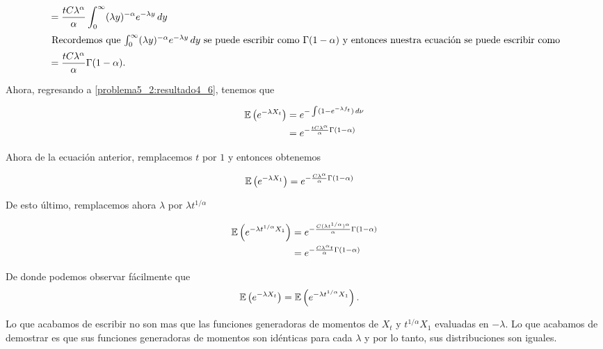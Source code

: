 \begin{align}
                                        &=  \frac{tC \lambda^{\alpha}}{\alpha} \int_0^\infty  (\lambda y)^{-\alpha}  e^{-\lambda y}\,dy         \\
    \intertext{
    Recordemos que $\int_0^\infty  (\lambda y)^{-\alpha}  e^{-\lambda y}\,dy$ se puede escribir 
    como $\Gamma(1-\alpha)$ y entonces nuestra ecuación se puede escribir como}
                                        &=  \frac{tC \lambda^{\alpha}}{\alpha} \Gamma(1-\alpha).                                                 \\
\end{align}

Ahora, regresando a \eqref{problema5_2:resultado4_6}, tenemos que 

\begin{align}
    \mathbb{E}\left( e^{- \lambda X_t} \right)  &=  e^{-\int (1-e^{-\lambda f_t}) \,d\nu}                               \\
                                        &=  e^{-\frac{tC \lambda^{\alpha}}{\alpha} \Gamma(1-\alpha)}            \\
\end{align}\pn

Ahora de la ecuación anterior, remplacemos $t$ por $1$ y entonces obtenemos

\begin{align}
    \mathbb{E}\left( e^{- \lambda X_1} \right)   &= e^{-\frac{C \lambda^{\alpha}}{\alpha} \Gamma(1-\alpha)}
\end{align}

De esto último, remplacemos ahora $\lambda$ por $\lambda t^{1/\alpha}$

\begin{align}
    \mathbb{E}\left( e^{- \lambda t^{1/\alpha} X_1} \right)   &= e^{-\frac{C (\lambda t^{1/\alpha})^{\alpha}}{\alpha} \Gamma(1-\alpha)}    \\
                                                      &= e^{-\frac{C \lambda^\alpha t}{\alpha} \Gamma(1-\alpha)}    \\
\end{align}

De donde podemos observar fácilmente que
\begin{align}
    \mathbb{E}\left( e^{- \lambda X_t} \right)  &=  \mathbb{E}\left( e^{- \lambda t^{1/\alpha} X_1} \right).
\end{align}

Lo que acabamos de escribir no son mas que las funciones generadoras de momentos de $X_t$ y $t^{1/\alpha} X_1$ evaluadas en $-\lambda$. Lo que 
acabamos de demostrar es que sus funciones generadoras de momentos son idénticas para cada $\lambda$ y por lo tanto, sus distribuciones son iguales.
